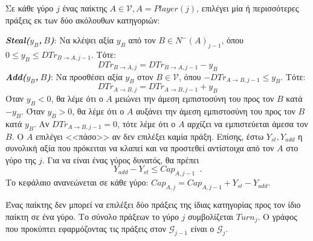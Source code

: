 \begin{definition}[Γύροι]
  Σε κάθε γύρο $j$ ένας παίκτης $A \in \mathcal{V}, A = Player\left(j\right)$, επιλέγει μία ή περισσότερες πράξεις εκ των δύο
  ακόλουθων κατηγοριών:

  \noindent \textit{\textbf{\textlatin{Steal}($y_B$,$\:B$)}}: Να κλέψει αξία $y_B$ από τον $B \in N^{-}\left(A\right)_{j-1}$,
  όπου $0 \leq y_B \leq DTr_{B \rightarrow A, j-1}$. Τότε:
  \begin{equation*}
     DTr_{B \rightarrow A, j} = DTr_{B \rightarrow A, j-1} - y_B
  \end{equation*}
  \noindent \textit{\textbf{\textlatin{Add}($y_B$,$\:B$)}}: Να προσθέσει αξία $y_B$ στον $B \in \mathcal{V}$, όπου
  $-DTr_{A \rightarrow B, j-1} \leq y_B$. Τότε:
  \begin{equation*}
     DTr_{A \rightarrow B, j} = DTr_{A \rightarrow B, j-1} + y_B
  \end{equation*}
  Όταν $y_B < 0$, θα λέμε ότι ο $A$ μειώνει την άμεση εμπιστοσύνη του προς τον $B$ κατά $-y_B$. Όταν $y_B > 0$, θα λέμε ότι ο
  $A$ αυξάνει την άμεση εμπιστοσύνη του προς τον $B$ κατά $y_B$. Αν $DTr_{A \rightarrow B, j-1} = 0$, τότε λέμε ότι ο $A$
  αρχίζει να εμπιστεύεται άμεσα τον $B$. Ο $A$ επιλέγει <<πάσο>> αν δεν επιλέξει καμία πράξη. Επίσης, έστω $Y_{st}, Y_{add}$ η
  συνολική αξία που πρόκειται να κλαπεί και να προστεθεί αντίστοιχα από τον $A$ στο γύρο της $j$. Για να είναι ένας γύρος
  δυνατός, θα πρέπει
  \begin{equation}
     Y_{add} - Y_{st} \leq Cap_{A, j-1} \enspace.
  \end{equation}
  Το κεφάλαιο ανανεώνεται σε κάθε γύρο: $Cap_{A, j} = Cap_{A, j-1} + Y_{st} - Y_{add}$.

  Ένας παίκτης δεν μπορεί να επιλέξει δύο πράξεις της ίδιας κατηγορίας προς τον ίδιο παίκτη σε ένα γύρο. Το σύνολο πράξεων
  το γύρο $j$ συμβολίζεται $Turn_j$. Ο γράφος που προκύπτει εφαρμόζοντας τις πράξεις στον $\mathcal{G}_{j-1}$ είναι ο
  $\mathcal{G}_j$.
\end{definition}
